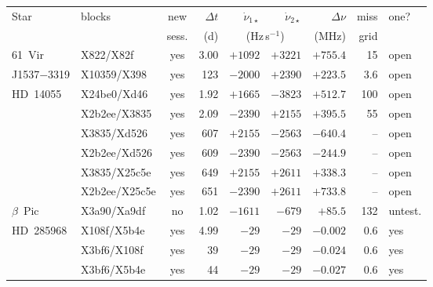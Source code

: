 \begin{tabular}{@{}l@{\,}l@{\,}c@{\,}r@{\,}r@{\,}r@{\,}r@{\,}r@{\,}l@{}}
\hline
Star & blocks & new & $\Delta t$ & $\dot\nu_{1\star}$ & $\dot\nu_{2\star}$ & $\Delta\nu$ & miss & one? \\
 & & sess. & (d) & \multicolumn{2}{c}{(Hz\,s$^{-1}$)} & (MHz) & grid & \\
\hline
61~Vir & X822/X82f & yes & 3.00 & $+1092$ & $+3221$ & $+755.4$ & 15 & open \\
J1537$-$3319 & X10359/X398 & yes & 123 & $-2000$ & $+2390$ & $+223.5$ & 3.6 & open \\
HD~14055 & X24be0/Xd46 & yes & 1.92 & $+1665$ & $-3823$ & $+512.7$ & 100 & open \\
 & X2b2ee/X3835 & yes & 2.09 & $-2390$ & $+2155$ & $+395.5$ & 55 & open \\
 & X3835/Xd526 & yes & 607 & $+2155$ & $-2563$ & $-640.4$ & -- & open \\
 & X2b2ee/Xd526 & yes & 609 & $-2390$ & $-2563$ & $-244.9$ & -- & open \\
 & X3835/X25c5e & yes & 649 & $+2155$ & $+2611$ & $+338.3$ & -- & open \\
 & X2b2ee/X25c5e & yes & 651 & $-2390$ & $+2611$ & $+733.8$ & -- & open \\
$\beta$~Pic & X3a90/Xa9df & no & 1.02 & $-1611$ & $-679$ & $+85.5$ & 132 & untest. \\
\hline
HD~285968 & X108f/X5b4e & yes & 4.99 & $-29$ & $-29$ & $-0.002$ & 0.6 & yes \\
 & X3bf6/X108f & yes & 39 & $-29$ & $-29$ & $-0.024$ & 0.6 & yes \\
 & X3bf6/X5b4e & yes & 44 & $-29$ & $-29$ & $-0.027$ & 0.6 & yes \\
\hline
\end{tabular}
